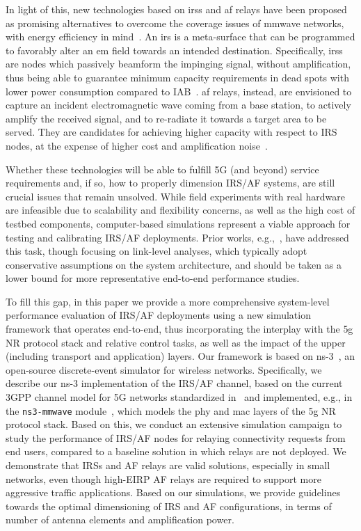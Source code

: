 In light of this, new technologies based on \glspl{irs} and \gls{af} relays have been proposed as promising alternatives to overcome the coverage issues of \gls{mmwave} networks, with energy efficiency in mind~\cite{flamini2022towards}. 
An \gls{irs} is a meta-surface that can be programmed to favorably alter an \gls{em} field towards an intended destination. 
Specifically, \glspl{irs} are nodes which passively beamform the impinging signal, without amplification, thus being able to guarantee minimum capacity requirements in dead spots with lower power consumption compared to IAB~\cite{bjornson2019intelligent}. 
\Gls{af} relays, instead, are envisioned to capture an incident electromagnetic wave %
coming from a base station, to actively amplify the received signal, and to re-radiate it %
towards a target area to be served. They are candidates for achieving higher capacity with respect to IRS nodes, at the expense of higher cost and amplification noise~\cite{huang2019reconfigurable}.

Whether these technologies will be able to fulfill 5G (and beyond) service requirements and, if so, how to properly dimension IRS/AF systems, are still crucial issues that remain unsolved. 
While field experiments with real hardware are infeasible due to scalability and flexibility concerns, as well as the high cost of testbed components, computer-based simulations represent a viable approach for testing and calibrating IRS/AF deployments. %
Prior works, e.g.,~\cite{wu2018intelligent,9282349}, have addressed this task, though focusing on link-level analyses, which typically adopt conservative assumptions on the system architecture, and should be taken as a lower bound for more representative end-to-end performance studies.

To fill this gap, in this paper we provide a more comprehensive system-level performance evaluation of IRS/AF deployments using a new simulation
framework that operates end-to-end, thus incorporating the interplay with the \gls{5g} NR protocol stack and relative control tasks, as well as the impact of the upper (including transport and application) layers.
Our framework is based on \mbox{ns-3}~\cite{ns3}, an open-source discrete-event simulator for wireless networks.
Specifically, we describe our ns-3 implementation of the IRS/AF channel, based on the current 3GPP channel model for 5G networks standardized in~\cite{3gpp.38.901} and implemented, e.g., in the \texttt{ns3-mmwave} module~\cite{mezzavilla2018end}, which models the \gls{phy} and \gls{mac} layers of the \gls{5g} NR protocol stack.
Based on this, we conduct an extensive simulation campaign to study the performance of IRS/AF nodes for relaying connectivity requests from end users, compared to a baseline solution in which relays are not deployed. 
We demonstrate that IRSs and AF relays are valid solutions, especially in small networks, even though high-EIRP AF relays are required to support more aggressive traffic applications.
Based on our simulations, we provide guidelines towards the optimal dimensioning of IRS and AF configurations, in terms of number of antenna elements and amplification power.


